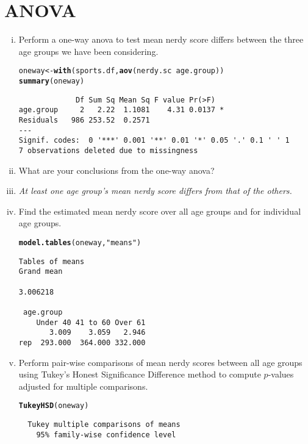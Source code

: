 \documentclass[12pt,a4paper]{article}\usepackage[]{graphicx}\usepackage[]{color}
\makeatletter
\newcommand{\hlstr}[1]{\textcolor[rgb]{0.192,0.494,0.8}{#1}}%
\newcommand{\hlopt}[1]{\textcolor[rgb]{0,0,0}{#1}}%
\newcommand{\hlstd}[1]{\textcolor[rgb]{0.345,0.345,0.345}{#1}}%
\newcommand{\hlkwb}[1]{\textcolor[rgb]{0.69,0.353,0.396}{#1}}%
\newcommand{\hlkwd}[1]{\textcolor[rgb]{0.737,0.353,0.396}{\textbf{#1}}}%
\newenvironment{kframe}{%
 \def\at@end@of@kframe{}%
 \ifinner\ifhmode%
  \def\at@end@of@kframe{\end{minipage}}%
  \begin{minipage}{\columnwidth}%
 \fi\fi%
 \def\FrameCommand##1{\hskip\@totalleftmargin \hskip-\fboxsep
 \colorbox{shadecolor}{##1}\hskip-\fboxsep
     \hskip-\linewidth \hskip-\@totalleftmargin \hskip\columnwidth}%
 \MakeFramed {\advance\hsize-\width
   \@totalleftmargin\z@ \linewidth\hsize
   \@setminipage}}%
 {\par\unskip\endMakeFramed%
 \at@end@of@kframe}
\newenvironment{knitrout}{}{} %
\makeatother
\begin{document}
\section{ANOVA} 
\label{sec:anova}
\begin{enumerate}[(i)]
\item Perform a one-way anova to test mean nerdy score differs between the three age groups we have been considering.
\begin{knitrout}
\color{fgcolor}\begin{kframe}
\begin{alltt}
\hlstd{oneway} \hlkwb{<-} \hlkwd{with}\hlstd{(sports.df,} \hlkwd{aov}\hlstd{(nerdy.sc}\hlopt{~}\hlstd{age.group))}
\hlkwd{summary}\hlstd{(oneway)}
\end{alltt}
\begin{verbatim}
             Df Sum Sq Mean Sq F value Pr(>F)  
age.group     2   2.22  1.1081    4.31 0.0137 *
Residuals   986 253.52  0.2571                 
---
Signif. codes:  0 '***' 0.001 '**' 0.01 '*' 0.05 '.' 0.1 ' ' 1
7 observations deleted due to missingness
\end{verbatim}
\end{kframe}
\end{knitrout}
\item What are your conclusions from the one-way anova?
\item[] {\em At least one age group's mean nerdy score differs from that of the others.}
\item Find the estimated mean nerdy score over all age groups and for individual age groups.
\begin{knitrout}
\color{fgcolor}\begin{kframe}
\begin{alltt}
\hlkwd{model.tables}\hlstd{(oneway,} \hlstr{"means"}\hlstd{)}
\end{alltt}
\begin{verbatim}
Tables of means
Grand mean
         
3.006218 

 age.group 
    Under 40 41 to 60 Over 61
       3.009    3.059   2.946
rep  293.000  364.000 332.000
\end{verbatim}
\end{kframe}
\end{knitrout}
\item Perform pair-wise comparisons of mean nerdy scores between all age groups using Tukey's Honest Significance Difference method to compute $p$-values adjusted for multiple comparisons.
\begin{knitrout}
\color{fgcolor}\begin{kframe}
\begin{alltt}
\hlkwd{TukeyHSD}\hlstd{(oneway)}
\end{alltt}
\begin{verbatim}
  Tukey multiple comparisons of means
    95% family-wise confidence level


\end{verbatim}
\end{kframe}
\end{knitrout}
\end{enumerate}
\end{document}
